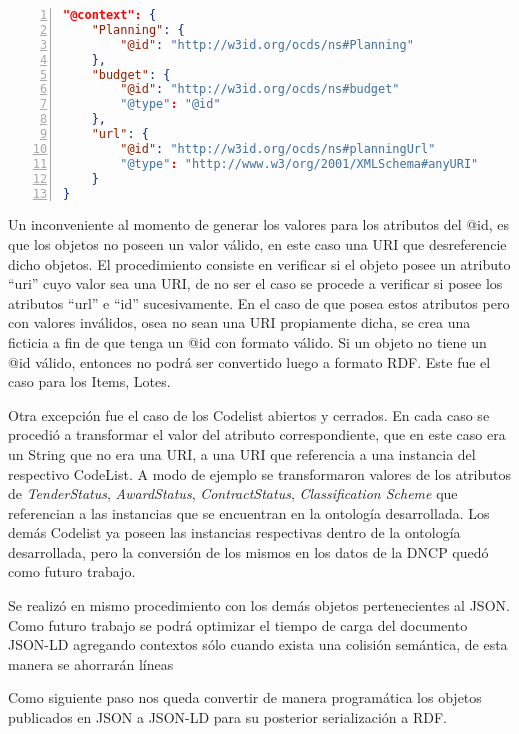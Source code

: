 \hfill \break

\noindent\begin{minipage}{\textwidth}
\begin{lstlisting}[captionpos=b, caption=Contexto del Objeto Planning, label=lst:json4,  numbers=left, language=json, firstnumber=1, numberstyle=\tiny\color{mygray},frame=single]
"@context": {
    "Planning": {
        "@id": "http://w3id.org/ocds/ns#Planning"
    },
    "budget": {
        "@id": "http://w3id.org/ocds/ns#budget"
        "@type": "@id"
    },
    "url": {
        "@id": "http://w3id.org/ocds/ns#planningUrl"
        "@type": "http://www.w3/org/2001/XMLSchema#anyURI"
    }
}

\end{lstlisting}
\end{minipage}

Un inconveniente al momento de generar los valores para los atributos del @id, es que los objetos no poseen un valor válido, en este caso una URI que desreferencie dicho objetos. El procedimiento consiste en verificar si el objeto posee un atributo “uri” cuyo valor sea una URI, de no ser el caso se procede a verificar si posee los atributos “url” e “id” sucesivamente. En el caso de que posea estos atributos pero con valores inválidos, osea no sean una URI propiamente dicha, se crea una ficticia a fin de que tenga un @id con formato válido. Si un objeto no tiene un @id válido, entonces no podrá ser convertido luego a formato RDF. Este fue el caso para los Items, Lotes.

Otra excepción fue el caso de los Codelist abiertos y cerrados. En cada caso se procedió a transformar el valor del atributo correspondiente, que en este caso era un String que no era una URI, a una URI que referencia a una instancia del respectivo CodeList. A modo de ejemplo se transformaron valores de los atributos de \textit{TenderStatus}, \textit{AwardStatus}, \textit{ContractStatus}, \textit{Classification Scheme} que referencian a las instancias que se encuentran en la ontología desarrollada. Los demás Codelist ya poseen las instancias respectivas dentro de la ontología desarrollada, pero la conversión de los mismos en los datos de la DNCP quedó como futuro trabajo.

Se realizó en mismo procedimiento con los demás objetos pertenecientes al JSON. Como futuro trabajo se podrá optimizar el tiempo de carga del documento JSON-LD agregando contextos sólo cuando exista una colisión semántica, de esta manera se ahorrarán líneas

Como siguiente paso nos queda convertir de manera programática los objetos publicados en JSON a JSON-LD para su posterior serialización a RDF.

